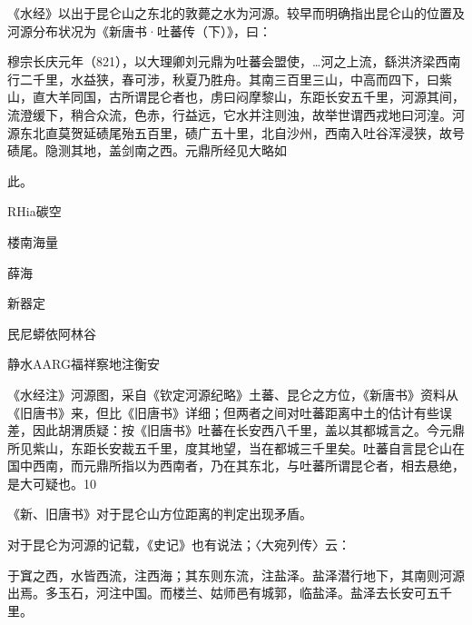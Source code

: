 《水经》以出于昆仑山之东北的敦薨之水为河源。较早而明确指出昆仑山的位置及河源分布状况为《新唐书·吐蕃传（下）》，曰：

\begin{BookQuote}
穆宗长庆元年（821），以大理卿刘元鼎为吐蕃会盟使，…河之上流，繇洪济梁西南行二千里，水益狭，春可涉，秋夏乃胜舟。其南三百里三山，中高而四下，曰紫山，直大羊同国，古所谓昆仑者也，虏曰闷摩黎山，东距长安五千里，河源其间，流澄缓下，稍合众流，色赤，行益远，它水并注则浊，故举世谓西戎地曰河湟。河源东北直莫贺延碛尾殆五百里，碛广五十里，北自沙州，西南入吐谷浑浸狭，故号碛尾。隐测其地，盖剑南之西。元鼎所经见大略如
\end{BookQuote}

此。

\vfill
\begin{BookNotes}
\end{BookNotes}

RHia碳空

楼南海量

薛海

新器定

\begin{BookQuote}
民尼蟒依阿林谷
\end{BookQuote}

静水AARG福祥察地注衡安

《水经注》河源图，采自《钦定河源纪略》土蕃、昆仑之方位，《新唐书》资料从《旧唐书》来，但比《旧唐书》详细；但两者之间对吐蕃距离中土的估计有些误差，因此胡渭质疑：按《旧唐书》吐蕃在长安西八千里，盖以其都城言之。今元鼎所见紫山，东距长安裁五千里，度其地望，当在都城三千里矣。吐蕃自言昆仑山在国中西南，而元鼎所指以为西南者，乃在其东北，与吐蕃所谓昆仑者，相去悬绝，是大可疑也。10

《新、旧唐书》对于昆仑山方位距离的判定出现矛盾。

对于昆仑为河源的记载，《史记》也有说法；〈大宛列传〉云：

于窴之西，水皆西流，注西海；其东则东流，注盐泽。盐泽潜行地下，其南则河源出焉。多玉石，河注中国。而楼兰、姑师邑有城郭，临盐泽。盐泽去长安可五千里。


